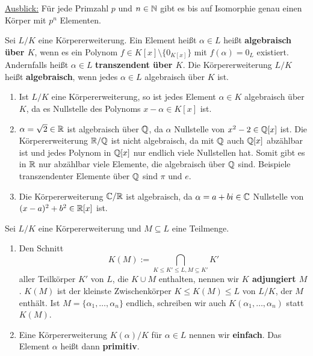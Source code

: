 \underline{Ausblick:} Für jede Primzahl $p$ und $n \in \mathbb{N}$ gibt es bis auf Isomorphie genau einen Körper mit $p^n$ Elementen.
\begin{definition}
	Sei $L / K$ eine Körpererweiterung. Ein Element heißt $\alpha \in L$ heißt \textbf{algebraisch über $K$}, wenn es ein Polynom $f \in K[x] \setminus \{0_{K[x]}\}$ mit $f(\alpha) = 0_L$ existiert. Andernfalls heißt $\alpha \in L$ \textbf{transzendent über $K$}. Die Körpererweiterung $L/K$ heißt \textbf{algebraisch}, wenn jedes $\alpha \in L$ algebraisch über $K$ ist.
\end{definition}
\begin{beispiel}\label{beispiel7_10}
	\begin{enumerate}[label=(\arabic*)]
		\item Ist $L/K$ eine Körpererweiterung, so ist jedes Element $\alpha \in K$ algebraisch über $K$, da es Nullstelle des Polynoms $x - \alpha \in K[x]$ ist.
		\item $\alpha = \sqrt{2} \in \mathbb{R}$ ist algebraisch über $\mathbb{Q}$, da $\alpha$ Nullstelle von $x^2 - 2 \in \mathbb{Q}[x]$ ist. Die Körpererweiterung $\mathbb{R}/\mathbb{Q}$ ist nicht algebraisch, da mit $\mathbb{Q}$ auch $\mathbb{Q}[x]$ abzählbar ist und jedes Polynom in $\mathbb{Q}[x]$ nur endlich viele Nullstellen hat.
		Somit gibt es in $\mathbb{R}$ nur abzählbar viele Elemente, die algebraisch über $\mathbb{Q}$ sind. Beispiele transzendenter Elemente über $\mathbb{Q}$ sind $\pi$ und $e$.
		\item Die Körpererweiterung $\mathbb{C}/\mathbb{R}$ ist algebraisch, da $\alpha = a+ bi \in \mathbb{C}$ Nullstelle von $(x-a)^2 + b^2 \in \mathbb{R}[x]$ ist.
	\end{enumerate}
\end{beispiel}
\begin{definition}
	Sei $L/K$ eine Körpererweiterung und $M \subseteq L$ eine Teilmenge. 
	\begin{enumerate}[label=(\alph*)]
		\item Den Schnitt
		\[K(M) := \bigcap_{K \leq K' \leq L, M \subseteq K'} K'\]
		aller Teilkörper $K'$ von $L$, die $K \cup M$ enthalten, nennen wir \textbf{$K$ adjungiert $M$}. $K(M)$ ist der kleinste Zwischenkörper $K \leq K(M) \leq L$ von $L/K$, der $M$ enthält. Ist $M = \{\alpha_1, \dots, \alpha_n\}$ endlich, schreiben wir auch $K(\alpha_1, \dots, \alpha_n)$ statt $K(M)$.
		\item Eine Körpererweiterung $K(\alpha)/K$ für $\alpha \in L$ nennen wir \textbf{einfach}. Das Element $\alpha$ heißt dann \textbf{primitiv}.
	\end{enumerate}
\end{definition}
